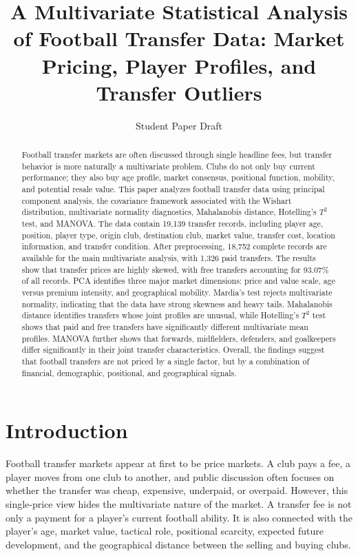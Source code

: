 \documentclass[12pt]{article}
\title{A Multivariate Statistical Analysis of Football Transfer Data: Market Pricing, Player Profiles, and Transfer Outliers}
\author{Student Paper Draft}
\date{}
\begin{document}
\maketitle

\begin{abstract}
Football transfer markets are often discussed through single headline fees, but transfer behavior is more naturally a multivariate problem. Clubs do not only buy current performance; they also buy age profile, market consensus, positional function, mobility, and potential resale value. This paper analyzes football transfer data using principal component analysis, the covariance framework associated with the Wishart distribution, multivariate normality diagnostics, Mahalanobis distance, Hotelling's $T^2$ test, and MANOVA. The data contain 19,139 transfer records, including player age, position, player type, origin club, destination club, market value, transfer cost, location information, and transfer condition. After preprocessing, 18,752 complete records are available for the main multivariate analysis, with 1,326 paid transfers. The results show that transfer prices are highly skewed, with free transfers accounting for 93.07\% of all records. PCA identifies three major market dimensions: price and value scale, age versus premium intensity, and geographical mobility. Mardia's test rejects multivariate normality, indicating that the data have strong skewness and heavy tails. Mahalanobis distance identifies transfers whose joint profiles are unusual, while Hotelling's $T^2$ test shows that paid and free transfers have significantly different multivariate mean profiles. MANOVA further shows that forwards, midfielders, defenders, and goalkeepers differ significantly in their joint transfer characteristics. Overall, the findings suggest that football transfers are not priced by a single factor, but by a combination of financial, demographic, positional, and geographical signals.
\end{abstract}

\section{Introduction}

Football transfer markets appear at first to be price markets. A club pays a fee, a player moves from one club to another, and public discussion often focuses on whether the transfer was cheap, expensive, underpaid, or overpaid. However, this single-price view hides the multivariate nature of the market. A transfer fee is not only a payment for a player's current football ability. It is also connected with the player's age, market value, tactical role, positional scarcity, expected future development, and the geographical distance between the selling and buying clubs.
\end{document}
